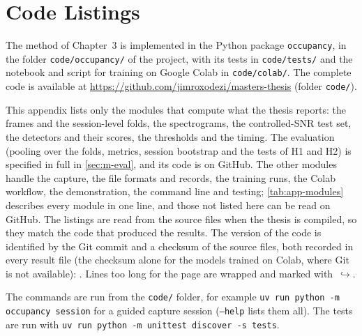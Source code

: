 \chapter{Code Listings}
\label{app:code}



The method of Chapter~3 is implemented in the Python package \texttt{occupancy}, in the folder \texttt{code/occupancy/} of the project, with its tests in \texttt{code/tests/} and the notebook and script for training on Google Colab in \texttt{code/colab/}. The complete code is available at \url{https://github.com/jimroxodezi/masters-thesis} (folder \texttt{code/}).%


This appendix lists only the modules that compute what the thesis reports: the frames and the session-level folds, the spectrograms, the controlled-SNR test set, the detectors and their scores, the thresholds and the timing. The evaluation (pooling over the folds, metrics, session bootstrap and the tests of H1 and H2) is specified in full in \cref{sec:m-eval}, and its code is on GitHub. The other modules handle the capture, the file formats and records, the training runs, the Colab workflow, the demonstration, the command line and testing; \cref{tab:app-modules} describes every module in one line, and those not listed here can be read on GitHub. The listings are read from the source files when the thesis is compiled, so they match the code that produced the results. The version of the code is identified by the Git commit and a checksum of the source files, both recorded in every result file (the checksum alone for the models trained on Colab, where Git is not available): . Lines too long for the page are wrapped and marked with~$\hookrightarrow$.

The commands are run from the \texttt{code/} folder, for example \texttt{uv run python -m occupancy session} for a guided capture session (\texttt{--help} lists them all). The tests are run with \texttt{uv run python -m unittest discover -s tests}.

